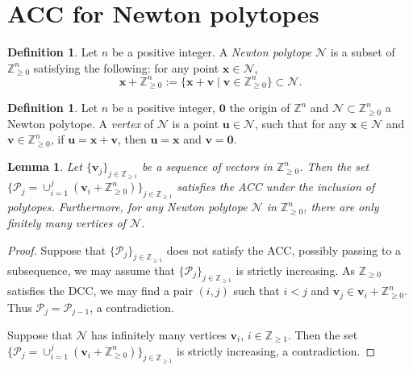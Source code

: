 \documentclass[11pt]{amsart}
\numberwithin{equation}{section}
\newcommand{\Zz}{\mathbb{Z}}
\newcommand{\Zzzero}{{\mathbb Z^n_{\ge0}}}
\newtheorem{lem}[thm]{Lemma}
\theoremstyle{definition}
\theoremstyle{definition}
\newtheorem{defn}[thm]{Definition}
\begin{document}
\appendix


\section{ACC for Newton polytopes}


\begin{defn}\label{defn: newton polytope zd}
Let $n$ be a positive integer. A \emph{Newton polytope} $\mathcal{N}$ is a subset of $\mathbb{Z}_{\geq 0}^n$ satisfying the following: for any point $\bm{x}\in\mathcal{N}$, 
$$\bm{x}+\mathbb{Z}_{\geq 0}^n:=\{\bm{x}+\bm{v}\mid\bm{v}\in\mathbb{Z}_{\geq 0}^n\}\subset\mathcal{N}.$$
\end{defn}




\begin{defn}
Let $n$ be a positive integer, $\bm 0$ the origin of $\Zz^n$ and $\mathcal{N}\subset\mathbb{Z}_{\geq 0}^n$ a Newton polytope. A \emph{vertex} of $\mathcal{N}$ is a point $\bm{u}\in\mathcal{N}$, such that for any $\bm{x}\in\mathcal{N}$ and $\bm{v}\in\mathbb{Z}_{\geq 0}^n$, if $\bm{u}=\bm{x}+\bm{v}$, then $\bm{u}=\bm{x}$ and $\bm{v}=\bm{0}$.
\end{defn}



\begin{lem}\label{lem: weak ACC newton polytopes}
Let $\{\bm{v}_j\}_{j\in\Zz_{\ge1}}$ be a sequence of vectors in $\mathbb{Z}_{\geq 0}^n$. Then the set $\{\mathcal{P}_j=\cup_{i=1}^j (\bm{v}_i+\mathbb{Z}_{\geq 0}^n)\}_{j\in\Zz_{\ge1}}$ satisfies the ACC under the inclusion of polytopes. Furthermore, for any Newton polytope $\mathcal{N}$ in $\Zzzero$, there are only finitely many vertices of  $\mathcal{N}$.
\end{lem}


\begin{proof}
 Suppose that $\{\mathcal{P}_j\}_{j\in\Zz_{\ge1}}$ does not satisfy the ACC, possibly passing to a subsequence, we may assume that $\{\mathcal{P}_j\}_{j\in\Zz_{\ge1}}$ is strictly increasing. As $\mathbb{Z}_{\geq 0}$ satisfies the DCC, we may find a pair $(i, j)$ such that $i<j$ and $\bm{v}_j\in \bm{v}_i+\mathbb{Z}_{\geq 0}^n$. Thus $\mathcal{P}_j= \mathcal{P}_{j-1}$, a contradiction.
 
 Suppose that $\mathcal{N}$ has infinitely many vertices $\bm{v}_i$, $i\in\Zz_{\ge 1}$. Then the set $\{\mathcal{P}_j=\cup_{i=1}^j (\bm{v}_i+\mathbb{Z}_{\geq 0}^n)\}_{j\in\Zz_{\ge1}}$ is strictly increasing, a contradiction. 
\end{proof}
\end{document}
